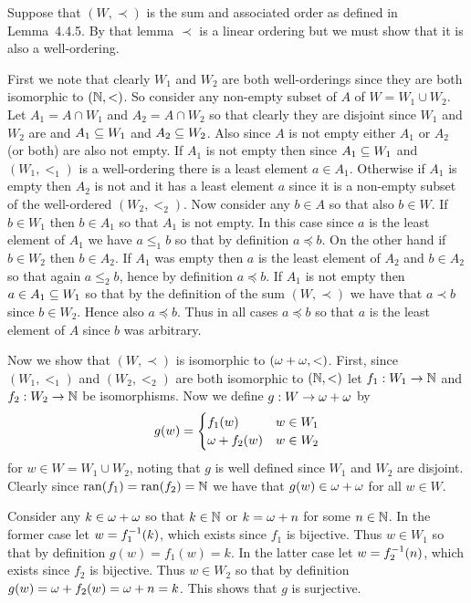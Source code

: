 \begin{solution}
	Suppose that $(W, \prec)$ is the sum and associated order as defined in Lemma~4.4.5.
    By that lemma $\prec$ is a linear ordering but we must show that it is also a well-ordering.

    First we note that clearly $W_1$ and $W_2$ are both well-orderings since they are both isomorphic to $(\nats, <)$.
    So consider any non-empty subset of $A$ of $W = W_1 \cup W_2$.
    Let $A_1 = A \cap W_1$ and $A_2 = A \cap W_2$ so that clearly they are disjoint since $W_1$ and $W_2$ are and $A_1 \ss W_1$ and $A_2 \ss W_2$.
    Also since $A$ is not empty either $A_1$ or $A_2$ (or both) are also not empty.
    If $A_1$ is not empty then since $A_1 \ss W_1$ and $(W_1, <_1)$ is a well-ordering there is a least element $a \in A_1$.
    Otherwise if $A_1$ is empty then $A_2$ is not and it has a least element $a$ since it is a non-empty subset of the well-ordered $(W_2, <_2)$.
    Now consider any $b \in A$ so that also $b \in W$.
    If $b \in W_1$ then $b \in A_1$ so that $A_1$ is not empty.
    In this case since $a$ is the least element of $A_1$ we have $a \leq_1 b$ so that by definition $a \preceq b$.
    On the other hand if $b \in W_2$ then $b \in A_2$.
    If $A_1$ was empty then $a$ is the least element of $A_2$ and $b \in A_2$ so that again $a \leq_2 b$, hence by definition $a \preceq b$.
    If $A_1$ is not empty then $a \in A_1 \ss W_1$ so that by the definition of the sum $(W, \prec)$ we have that $a \prec b$ since $b \in W_2$.
    Hence also $a \preceq b$.
    Thus in all cases $a \preceq b$ so that $a$ is the least element of $A$ since $b$ was arbitrary.

    Now we show that $(W, \prec)$ is isomorphic to $(\w + \w, <)$.
    First, since $(W_1, <_1)$ and $(W_2, <_2)$ are both isomorphic to $(\nats, <)$ let $f_1 : W_1 \to \nats$ and $f_2 : W_2 \to \nats$ be isomorphisms.
    Now we define $g : W \to \w + \w$ by
    $$
    g(w) = \begin{cases}
         f_1(w) & w \in W_1 \\
         \w + f_2(w) & w \in W_2
    \end{cases}
    $$
    for $w \in W = W_1 \cup W_2$, noting that $g$ is well defined since $W_1$ and $W_2$ are disjoint.
    Clearly since $\ran(f_1) = \ran(f_2) = \nats$ we have that $g(w) \in \w + \w$ for all $w \in W$.

    Consider any $k \in \w + \w$ so that $k \in \nats$ or $k = \w + n$ for some $n \in \nats$.
    In the former case let $w = \inv{f_1}(k)$, which exists since $f_1$ is bijective.
    Thus $w \in W_1$ so that by definition $g(w) = f_1(w) = k$.
    In the latter case let $w = \inv{f_2}(n)$, which exists since $f_2$ is bijective.
    Thus $w \in W_2$ so that by definition $g(w) = \w + f_2(w) = \w + n = k$.
    This shows that $g$ is surjective.


\end{solution}
